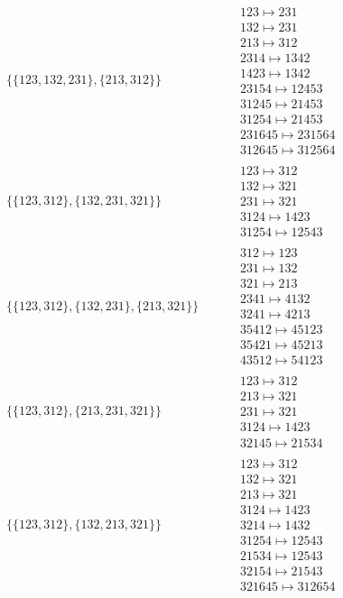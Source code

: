 \begin{tiny}
\begin{align}
\begin{matrix}
\end{matrix}
\\
\{\{123, 132, 231\}, \{213, 312\}\}
\quad
&
\phantom{.}
&
\begin{matrix}
123 \mapsto 231\\132 \mapsto 231\\213 \mapsto 312\\2314 \mapsto 1342\\1423 \mapsto 1342\\23154 \mapsto 12453\\31245 \mapsto 21453\\31254 \mapsto 21453\\231645 \mapsto 231564\\312645 \mapsto 312564
\end{matrix}
\\
\{\{123, 312\}, \{132, 231, 321\}\}
\quad
&
\phantom{.}
&
\begin{matrix}
123 \mapsto 312\\132 \mapsto 321\\231 \mapsto 321\\3124 \mapsto 1423\\31254 \mapsto 12543
\end{matrix}
\\
\{\{123, 312\}, \{132, 231\}, \{213, 321\}\}
\quad
&
\phantom{.}
&
\begin{matrix}
312 \mapsto 123\\231 \mapsto 132\\321 \mapsto 213\\2341 \mapsto 4132\\3241 \mapsto 4213\\35412 \mapsto 45123\\35421 \mapsto 45213\\43512 \mapsto 54123
\end{matrix}
\\
\{\{123, 312\}, \{213, 231, 321\}\}
\quad
&
\phantom{.}
&
\begin{matrix}
123 \mapsto 312\\213 \mapsto 321\\231 \mapsto 321\\3124 \mapsto 1423\\32145 \mapsto 21534
\end{matrix}
\\
\{\{123, 312\}, \{132, 213, 321\}\}
\quad
&
\phantom{.}
&
\begin{matrix}
123 \mapsto 312\\132 \mapsto 321\\213 \mapsto 321\\3124 \mapsto 1423\\3214 \mapsto 1432\\31254 \mapsto 12543\\21534 \mapsto 12543\\32154 \mapsto 21543\\321645 \mapsto 312654

\end{matrix}
\end{align}
\end{tiny}
